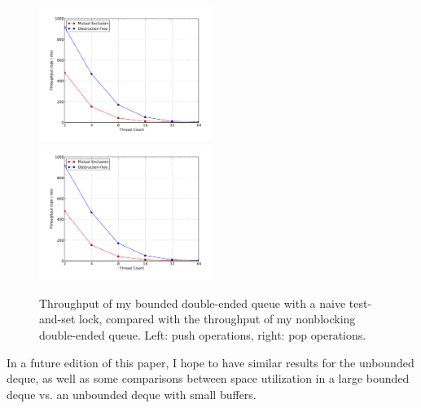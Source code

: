 \documentclass[11pt, letterpaper]{article}
\begin{document}
        \begin{figure}[t!]
            \includegraphics[width=0.5\textwidth]{herlihy/exp/throughput_push.pdf}
            \includegraphics[width=0.5\textwidth]{herlihy/exp/throughput_pop.pdf}
            \caption{Throughput of my bounded double-ended queue with a naive test-and-set lock, compared with the throughput of my nonblocking double-ended queue. Left: push operations, right: pop operations.}
            \label{figure::deque-plot}
        \end{figure}

        In a future edition of this paper, I hope to have similar results for the unbounded deque, as well as some comparisons between space utilization in a large bounded deque vs. an unbounded deque with small buffers.
\end{document}
